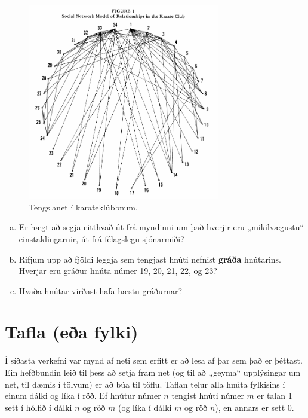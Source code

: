 \documentclass[b5paper,12pt]{book}
\begin{document}
\begin{figure}[h]
  \includegraphics[width=0.75\textwidth, center]{Karateclub.png}
  \caption*{Tengslanet í karateklúbbnum.}
\end{figure}

\begin{enumerate}[(a)]
    \item Er hægt að segja eitthvað út frá myndinni um það hverjir eru „mikilvægustu“ einstaklingarnir, út frá félagslegu sjónarmiði? 
    \item Rifjum upp að fjöldi leggja sem tengjast hnúti nefnist \textbf{gráða} hnútarins. Hverjar eru gráður hnúta númer 19, 20, 21, 22, og 23?
    \item Hvaða hnútar virðast hafa hæstu gráðurnar?
\end{enumerate}

\section{Tafla (eða fylki)}
Í síðasta verkefni var mynd af neti sem erfitt er að lesa af þar sem það er þéttast. Ein hefðbundin leið til þess að setja fram net (og til að „geyma“ upplýsingar um net, til dæmis í tölvum) er að búa til töflu. Taflan telur alla hnúta fylkisins í einum dálki og líka í röð. Ef hnútur númer $n$ tengist hnúti númer $m$ er talan 1 sett í hólfið í dálki $n$ og röð $m$ (og líka í dálki $m$ og röð $n$), en annars er sett 0. 
\end{document}
